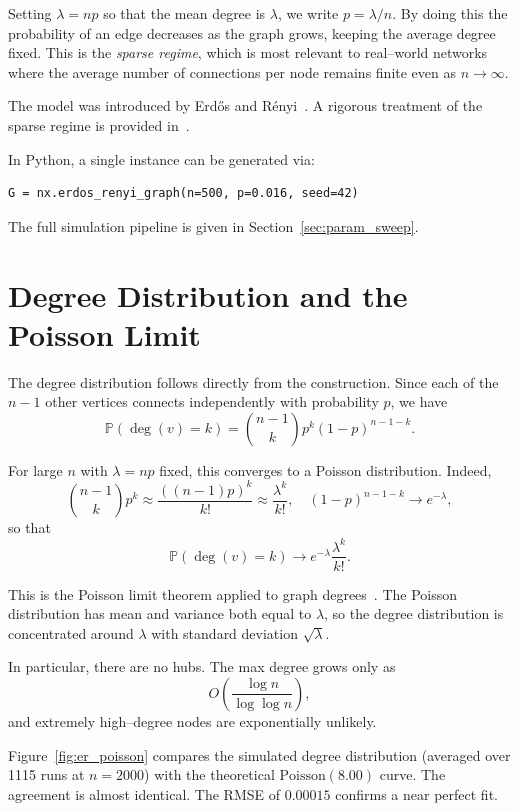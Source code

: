 \documentclass[12pt, a4paper]{report}
\theoremstyle{definition}
\theoremstyle{plain}
\theoremstyle{remark}
\begin{document}
Setting $\lambda = np$ so that the mean degree is $\lambda$, we
write $p = \lambda/n$. By doing this the probability of an edge
decreases as the graph grows, keeping the average degree
fixed. This is the \emph{sparse regime}, which is most relevant to
real--world networks where the average number of connections per 
node remains finite even as $n \to \infty$.

The model was introduced by Erdős and Rényi~\cite{erdos1959}. A
rigorous treatment of the sparse regime is provided
in~\cite[Ch.~4--5]{hofstad2017}.

In Python, a single instance can be generated via:
\begin{verbatim}
G = nx.erdos_renyi_graph(n=500, p=0.016, seed=42)
\end{verbatim}

The full simulation pipeline is given in 
Section~\ref{sec:param_sweep}.

\section{Degree Distribution and the Poisson Limit}
\label{sec:er_degree}

The degree distribution follows directly from the construction.
Since each of the $n-1$ other vertices connects independently with
probability $p$, we have
\[
\mathbb{P}(\deg(v) = k) = \binom{n-1}{k} p^k (1-p)^{n-1-k}.
\]

For large $n$ with $\lambda = np$ fixed, this converges to a
Poisson distribution. Indeed,
\[
\binom{n-1}{k} p^k \approx \frac{((n-1)p)^k}{k!} \approx
\frac{\lambda^k}{k!},
\quad
(1-p)^{n-1-k} \to e^{-\lambda},
\]
so that
\[
\mathbb{P}(\deg(v) = k) \to e^{-\lambda} \frac{\lambda^k}{k!}.
\]

This is the Poisson limit theorem applied to graph
degrees~\cite[Ch.~5]{hofstad2017}. The Poisson distribution has
mean and variance both equal to $\lambda$, so the degree
distribution is concentrated around $\lambda$ with standard
deviation $\sqrt{\lambda}$.

In particular, there are no hubs. The max degree grows only as
\[
O\!\left(\frac{\log n}{\log \log n}\right),
\]
and extremely high--degree nodes are exponentially unlikely.

Figure~\ref{fig:er_poisson} compares the simulated degree distribution
(averaged over 1115 runs at $n = 2000$) with the theoretical
$\text{Poisson}(8.00)$ curve. The agreement is almost identical. 
The RMSE of $0.00015$ confirms a near perfect fit.
\end{document}
